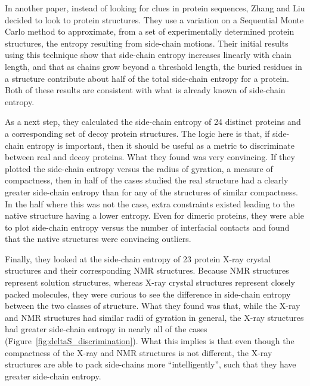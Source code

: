 In another paper, instead of looking for clues in protein sequences, Zhang and Liu\cite{Zhang:2006p11} decided to look to protein structures. They use a variation on a Sequential Monte Carlo method to approximate, from a set of experimentally determined protein structures, the entropy resulting from side-chain motions. Their initial results using this technique show that side-chain entropy increases linearly with chain length, and that as chains grow beyond a threshold length, the buried residues in a structure contribute about half of the total side-chain entropy for a protein. Both of these results are consistent with what is already known of side-chain entropy.

As a next step, they calculated the side-chain entropy of 24 distinct proteins and a corresponding set of decoy protein structures. The logic here is that, if side-chain entropy is important, then it should be useful as a metric to discriminate between real and decoy proteins. What they found was very convincing. If they plotted the side-chain entropy versus the radius of gyration, a measure of compactness, then in half of the cases studied the real structure had a clearly greater side-chain entropy than for any of the structures of similar compactness. In the half where this was not the case, extra constraints existed leading to the native structure having a lower entropy. Even for dimeric proteins, they were able to plot side-chain entropy versus the number of interfacial contacts and found that the native structures were convincing outliers.

Finally, they looked at the side-chain entropy of 23 protein X-ray crystal structures and their corresponding NMR structures. Because NMR structures represent solution structures, whereas X-ray crystal structures represent closely packed molecules, they were curious to see the difference in side-chain entropy between the two classes of structure. What they found was that, while the X-ray and NMR structures had similar radii of gyration in general, the X-ray structures had greater side-chain entropy in nearly all of the cases (Figure~\ref{fig:deltaS_discrimination}). What this implies is that even though the compactness of the X-ray and NMR structures is not different, the X-ray structures are able to pack side-chains more ``intelligently'', such that they have greater side-chain entropy.

